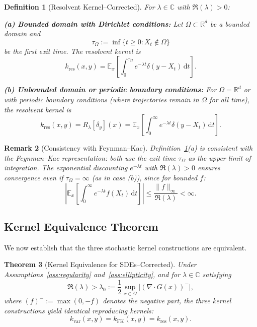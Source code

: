 \documentclass[11pt,a4paper]{article}
\newtheorem{theorem}{Theorem}[section]
\newtheorem{definition}[theorem]{Definition}
\newtheorem{remark}[theorem]{Remark}
\newcommand{\R}{\mathbb{R}}
\newcommand{\C}{\mathbb{C}}
\newcommand{\E}{\mathbb{E}}
\newcommand{\dt}{\,\mathrm{d}t}
\begin{document}
\begin{definition}[Resolvent Kernel--Corrected]\label{def:resolvent_kernel}
For $\lambda \in \C$ with $\Re(\lambda) > 0$:

\textbf{(a) Bounded domain with Dirichlet conditions:} Let $\Omega \subset \R^d$ be a bounded domain and 
\[
\tau_\Omega := \inf\{t \geq 0 : X_t \notin \Omega\}
\]
be the first exit time. The resolvent kernel is
\begin{equation}\label{eq:resolvent_kernel_bounded}
k_{\mathrm{res}}(x,y) = \E_x\left[\int_0^{\tau_\Omega} e^{-\lambda t} \delta(y - X_t) \dt\right].
\end{equation}

\textbf{(b) Unbounded domain or periodic boundary conditions:} For $\Omega = \R^d$ or with periodic boundary conditions (where trajectories remain in $\Omega$ for all time), the resolvent kernel is
\begin{equation}\label{eq:resolvent_kernel}
k_{\mathrm{res}}(x,y) = R_\lambda[\delta_y](x) = \E_x\left[\int_0^\infty e^{-\lambda t} \delta(y - X_t) \dt\right].
\end{equation}
\end{definition}

\begin{remark}[Consistency with Feynman--Kac]
Definition~\ref{def:resolvent_kernel}(a) is consistent with the Feynman--Kac representation: both use the exit time $\tau_\Omega$ as the upper limit of integration. The exponential discounting $e^{-\lambda t}$ with $\Re(\lambda) > 0$ ensures convergence even if $\tau_\Omega = \infty$ (as in case (b)), since for bounded $f$:
\[
\left|\E_x\left[\int_0^{\infty} e^{-\lambda t} f(X_t) \dt\right]\right| \leq \frac{\|f\|_\infty}{\Re(\lambda)} < \infty.
\]
\end{remark}

\subsection{Kernel Equivalence Theorem}

We now establish that the three stochastic kernel constructions are equivalent.

\begin{theorem}[Kernel Equivalence for SDEs--Corrected]\label{thm:kernel_equivalence}
Under Assumptions~\ref{ass:regularity} and~\ref{ass:ellipticity}, and for $\lambda \in \C$ satisfying
\begin{equation}\label{eq:lambda_condition}
\Re(\lambda) > \lambda_0 := \frac{1}{2}\sup_{x \in \Omega} |(\nabla \cdot G(x))^-|,
\end{equation}
where $(f)^- := \max(0, -f)$ denotes the negative part, the three kernel constructions yield identical reproducing kernels:
\begin{equation}
k_{\mathrm{var}}(x,y) = k_{\mathrm{FK}}(x,y) = k_{\mathrm{res}}(x,y).
\end{equation}
\end{theorem}
\end{document}
